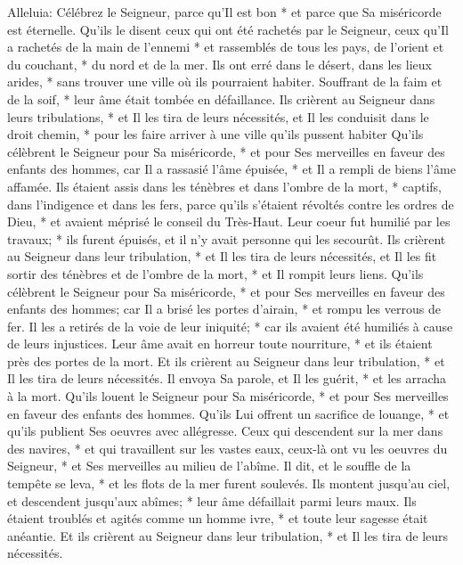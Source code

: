 Alleluia: Célébrez le Seigneur, parce qu'Il est bon * et parce que Sa miséricorde est éternelle.
Qu'ils le disent ceux qui ont été rachetés par le Seigneur, ceux qu'Il a rachetés de la main de l'ennemi * et rassemblés de tous les pays,
de l'orient et du couchant, * du nord et de la mer.
Ils ont erré dans le désert, dans les lieux arides, * sans trouver une ville où ils pourraient habiter.
Souffrant de la faim et de la soif, * leur âme était tombée en défaillance.
Ils crièrent au Seigneur dans leurs tribulations, * et Il les tira de leurs nécessités,
et Il les conduisit dans le droit chemin, * pour les faire arriver à une ville qu'ils pussent habiter
Qu'ils célèbrent le Seigneur pour Sa miséricorde, * et pour Ses merveilles en faveur des enfants des hommes,
car Il a rassasié l'âme épuisée, * et Il a rempli de biens l'âme affamée.
Ils étaient assis dans les ténèbres et dans l'ombre de la mort, * captifs, dans l'indigence et dans les fers,
parce qu'ils s'étaient révoltés contre les ordres de Dieu, * et avaient méprisé le conseil du Très-Haut.
Leur coeur fut humilié par les travaux; * ils furent épuisés, et il n'y avait personne qui les secourût.
Ils crièrent au Seigneur dans leur tribulation, * et Il les tira de leurs nécessités,
et Il les fit sortir des ténèbres et de l'ombre de la mort, * et Il rompit leurs liens.
Qu'ils célèbrent le Seigneur pour Sa miséricorde, * et pour Ses merveilles en faveur des enfants des hommes;
car Il a brisé les portes d'airain, * et rompu les verrous de fer.
Il les a retirés de la voie de leur iniquité; * car ils avaient été humiliés à cause de leurs injustices.
Leur âme avait en horreur toute nourriture, * et ils étaient près des portes de la mort.
Et ils crièrent au Seigneur dans leur tribulation, * et Il les tira de leurs nécessités.
Il envoya Sa parole, et Il les guérit, * et les arracha à la mort.
Qu'ils louent le Seigneur pour Sa miséricorde, * et pour Ses merveilles en faveur des enfants des hommes.
Qu'ils Lui offrent un sacrifice de louange, * et qu'ils publient Ses oeuvres avec allégresse.
Ceux qui descendent sur la mer dans des navires, * et qui travaillent sur les vastes eaux,
ceux-là ont vu les oeuvres du Seigneur, * et Ses merveilles au milieu de l'abîme.
Il dit, et le souffle de la tempête se leva, * et les flots de la mer furent soulevés.
Ils montent jusqu'au ciel, et descendent jusqu'aux abîmes; * leur âme défaillait parmi leurs maux.
Ils étaient troublés et agités comme un homme ivre, * et toute leur sagesse était anéantie.
Et ils crièrent au Seigneur dans leur tribulation, * et Il les tira de leurs nécessités.
